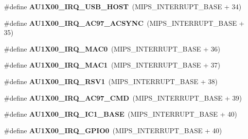 \begin{DoxyCompactItemize}
\#define {\bfseries A\+U1\+X00\+\_\+\+I\+R\+Q\+\_\+\+U\+S\+B\+\_\+\+H\+O\+ST}~(M\+I\+P\+S\+\_\+\+I\+N\+T\+E\+R\+R\+U\+P\+T\+\_\+\+B\+A\+SE + 34)
\item 
\mbox{\label{group__bsp__interrupt_ga8d50fe2c72911e5e65c6b1f0dd7a6521}} 
\#define {\bfseries A\+U1\+X00\+\_\+\+I\+R\+Q\+\_\+\+A\+C97\+\_\+\+A\+C\+S\+Y\+NC}~(M\+I\+P\+S\+\_\+\+I\+N\+T\+E\+R\+R\+U\+P\+T\+\_\+\+B\+A\+SE + 35)
\item 
\mbox{\label{group__bsp__interrupt_ga1bdd63425eacc1eff85f9ef61d8943ae}} 
\#define {\bfseries A\+U1\+X00\+\_\+\+I\+R\+Q\+\_\+\+M\+A\+C0}~(M\+I\+P\+S\+\_\+\+I\+N\+T\+E\+R\+R\+U\+P\+T\+\_\+\+B\+A\+SE + 36)
\item 
\mbox{\label{group__bsp__interrupt_ga8384e86639be068ffaa7628247bd43c8}} 
\#define {\bfseries A\+U1\+X00\+\_\+\+I\+R\+Q\+\_\+\+M\+A\+C1}~(M\+I\+P\+S\+\_\+\+I\+N\+T\+E\+R\+R\+U\+P\+T\+\_\+\+B\+A\+SE + 37)
\item 
\mbox{\label{group__bsp__interrupt_ga73a346bb567484919ec485232326851e}} 
\#define {\bfseries A\+U1\+X00\+\_\+\+I\+R\+Q\+\_\+\+R\+S\+V1}~(M\+I\+P\+S\+\_\+\+I\+N\+T\+E\+R\+R\+U\+P\+T\+\_\+\+B\+A\+SE + 38)
\item 
\mbox{\label{group__bsp__interrupt_gaab59ddd35f1acf20d70c828f7b70cc2c}} 
\#define {\bfseries A\+U1\+X00\+\_\+\+I\+R\+Q\+\_\+\+A\+C97\+\_\+\+C\+MD}~(M\+I\+P\+S\+\_\+\+I\+N\+T\+E\+R\+R\+U\+P\+T\+\_\+\+B\+A\+SE + 39)
\item 
\mbox{\label{group__bsp__interrupt_ga8f69685c3c6396321b02ef83ebef2eee}} 
\#define {\bfseries A\+U1\+X00\+\_\+\+I\+R\+Q\+\_\+\+I\+C1\+\_\+\+B\+A\+SE}~(M\+I\+P\+S\+\_\+\+I\+N\+T\+E\+R\+R\+U\+P\+T\+\_\+\+B\+A\+SE + 40)
\item 
\mbox{\label{group__bsp__interrupt_ga8e703085f041874fb68777126e1f7312}} 
\#define {\bfseries A\+U1\+X00\+\_\+\+I\+R\+Q\+\_\+\+G\+P\+I\+O0}~(M\+I\+P\+S\+\_\+\+I\+N\+T\+E\+R\+R\+U\+P\+T\+\_\+\+B\+A\+SE + 40)
\item 
\mbox{\label{group__bsp__interrupt_gada63f4c129094bbefe79862a2a307388}} 

\end{DoxyCompactItemize}
